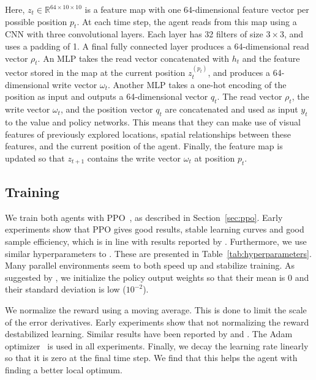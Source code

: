 Here, \(z_t \in \mathbb{R}^{64 \times 10 \times 10}\) is a feature map with one 64-dimensional feature vector per possible position \(p_t\).
At each time step, the agent reads from this map using a CNN with three convolutional layers.
Each layer has 32 filters of size \(3 \times 3\), and uses a padding of 1.
A final fully connected layer produces a 64-dimensional read vector \(\rho_t\).
An MLP takes the read vector concatenated with \(h_t\) and the feature vector stored in the map at the current position \(z_t^{(p_t)}\), and produces a 64-dimensional write vector \(\omega_{t}\).
Another MLP takes a one-hot encoding of the position as input and outputs a 64-dimensional vector \(q_t\).
The read vector \(\rho_t\), the write vector \(\omega_{t}\), and the position vector \(q_t\) are concatenated and used as input \(y_t\) to the value and policy networks.
This means that they can make use of visual features of previously explored locations, spatial relationships between these features, and the current position of the agent.
Finally, the feature map is updated so that \(z_{t+1}\) contains the write vector \(\omega_{t}\) at position \(p_t\).


\subsection{Training}

We train both agents with PPO~\cite{schulman_proximal_2017}, as described in Section~\ref{sec:ppo}.
Early experiments show that PPO gives good results, stable learning curves and good sample efficiency, which is in line with results reported by \cite{andrychowicz_what_2020}.
Furthermore, we use similar hyperparameters to \cite{cobbe_leveraging_2020}.
These are presented in Table~\ref{tab:hyperparameters}.
Many parallel environments seem to both speed up and stabilize training. 
As suggested by \cite{andrychowicz_what_2020}, we initialize the policy output weights so that their mean is 0 and their standard deviation is low (\(10^{-2}\)).

We normalize the reward using a moving average.
This is done to limit the scale of the error derivatives.
Early experiments show that not normalizing the reward destabilized learning. %
Similar results have been reported by \cite{andrychowicz_what_2020} and \cite{mnih_playing_2013}.
The Adam optimizer~\cite{kingma_adam_2017} is used in all experiments.
Finally, we decay the learning rate linearly so that it is zero at the final time step.
We find that this helps the agent with finding a better local optimum.

